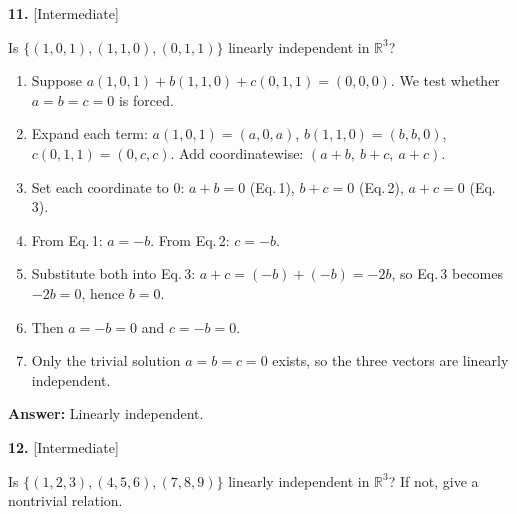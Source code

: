 \documentclass[11pt]{article}
\begin{document}
\par\vspace{2pt}
\begin{minipage}{\linewidth}\textbf{11.} \hfill{\scriptsize\color{ink}[Intermediate]}\par\nopagebreak Is $\{(1,0,1),(1,1,0),(0,1,1)\}$ linearly independent in $\mathbb{R}^{3}$?
\end{minipage}\par\nopagebreak
\begin{tcolorbox}[breakable,colback=ans,colframe=ansb,boxrule=0.5pt,left=4pt,right=4pt,top=2pt,bottom=2pt]\begin{enumerate}[leftmargin=2.2em,itemsep=1pt,topsep=1pt,label=\textbf{Step \arabic*.}]\item Suppose $a(1,0,1)+b(1,1,0)+c(0,1,1)=(0,0,0)$. We test whether $a=b=c=0$ is forced.
\item Expand each term: $a(1,0,1)=(a,0,a)$, $b(1,1,0)=(b,b,0)$, $c(0,1,1)=(0,c,c)$. Add coordinatewise: $(a+b,\ b+c,\ a+c)$.
\item Set each coordinate to $0$: $a+b=0$ \quad (Eq.\,1), \quad $b+c=0$ \quad (Eq.\,2), \quad $a+c=0$ \quad (Eq.\,3).
\item From Eq.\,1: $a=-b$. From Eq.\,2: $c=-b$.
\item Substitute both into Eq.\,3: $a+c=(-b)+(-b)=-2b$, so Eq.\,3 becomes $-2b=0$, hence $b=0$.
\item Then $a=-b=0$ and $c=-b=0$.
\item Only the trivial solution $a=b=c=0$ exists, so the three vectors are linearly independent.
\end{enumerate}\textbf{Answer:} Linearly independent.\end{tcolorbox}
\par\vspace{2pt}
\begin{minipage}{\linewidth}\textbf{12.} \hfill{\scriptsize\color{ink}[Intermediate]}\par\nopagebreak Is $\{(1,2,3),(4,5,6),(7,8,9)\}$ linearly independent in $\mathbb{R}^{3}$? If not, give a nontrivial relation.
\end{minipage}\par\nopagebreak
\end{document}
